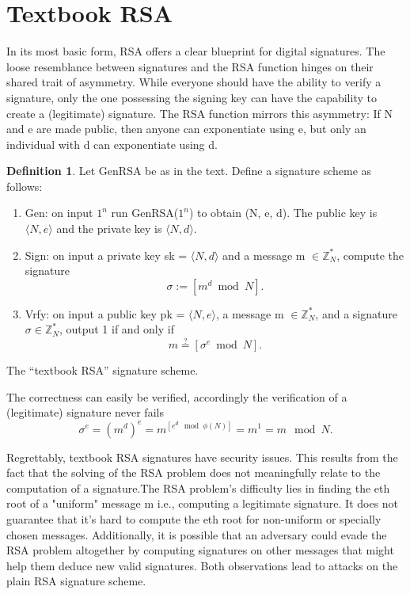 \documentclass[]{final_report}
\theoremstyle{definition}
\newtheorem{definition}{Definition}[chapter]
\begin{document}
\section{Textbook RSA}
In its most basic form, RSA offers a clear blueprint for digital signatures. The loose resemblance between signatures and the RSA function hinges on their shared trait of asymmetry. While everyone should have the ability to verify a signature, only the one possessing the signing key can have the capability to create a (legitimate) signature. The RSA function mirrors this asymmetry: If N and e are made public, then anyone can exponentiate using e, but only an individual with d can exponentiate using d. \begin{definition}
\label{def:textbook rsa}
Let GenRSA be as in the text. Define a signature scheme as follows:
\begin{enumerate}
    \item Gen: on input $1^n$ run GenRSA($1^n$) to obtain (N, e, d). The public key is $\langle N, e \rangle$ and the private key is $\langle N, d \rangle$.

    \item Sign: on input a private key sk = $\langle N, d \rangle$ and a message m $\in \mathbb{Z}^*_{N}$, compute the signature
\[\sigma := [m^d \bmod N].\]
    \item Vrfy:  on input a public key pk = $\langle N, e \rangle$, a message m $\in \mathbb{Z}^*_{N}$, and a signature $\sigma \in \mathbb{Z}^*_{N}$, output 1 if and only if
    \[m \stackrel{?}{=} [\sigma^e \bmod N].\]
\end{enumerate}
The “textbook RSA” signature scheme.
\end{definition}
The correctness can easily be verified, accordingly the verification of a (legitimate) signature never fails
\[\sigma^e = (m^d)^e = m^{[e^{d}\mod \phi(N)]} = m^1 = m\mod N.\]

Regrettably, textbook RSA signatures have security issues. This results from the fact that the solving of the RSA problem does not meaningfully relate to the computation of a signature.The RSA problem's difficulty lies in finding the eth root of a "uniform" message m i.e., computing a legitimate signature. It does not guarantee that it's hard to compute the eth root for non-uniform or specially chosen messages. Additionally, it is possible that an adversary could evade the RSA problem altogether by computing signatures on other messages that might help them deduce new valid signatures. Both observations lead to attacks on the plain RSA signature scheme. 
\end{document}
